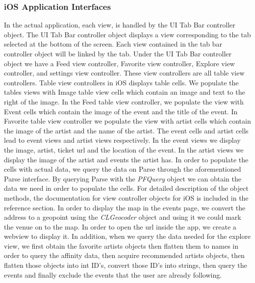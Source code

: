	  \subsubsection{iOS Application Interfaces}
	    In the actual application, each view, is handled by the UI Tab Bar controller object. The UI Tab Bar controller object displays a view 
	    corresponding to the tab selected at the bottom of the screen. Each view contained in the tab bar controller object will be linked by the 
	    tab. Under the UI Tab Bar controller object we have a Feed view controller, Favorite view controller, Explore view controller, and settings 
	    view controller. These view controllers are all table view controllers. Table view controllers in iOS displays table cells. We populate the 
	    tables views with Image table view cells which contain an image and text to the right of the image. In the Feed table view controller, we 
	    populate the view with Event cells which contain the image of the event and the title of the event. In Favorite table view controller we 
	    populate the view with artist cells which contain the image of the artist and the name of the artist. The event cells and artist cells lead to 
	    event views and artist views respectively. In the event views we display the image, artist, ticket url and the location of the event. In the 
	    artist views we display the image of the artist and events the artist has. In order to populate the cells with actual data, we query the data 
	    on Parse through the aforementioned Parse interface. By querying Parse with the \textit{PFQuery} object we can obtain the data we need in order 
	    to populate the cells. For detailed description of the object methods, the documentation for view controller objects for iOS is included in 
	    the reference section. In order to display the map in the events page, we convert the address to a geopoint using the \textit{CLGeocoder} object 
	    and using it we could mark the venue on to the map. In order to open the url inside the app, we create a webview to display it. In 
	    addition, when we query the data needed for the explore view, we first obtain the favorite artists objects then flatten them to names in 
	    order to query the affinity data, then acquire recommended artists objects, then flatten those objects into int ID’s, convert those ID’s into 
	    strings, then query the events and finally exclude the events that the user are already following. 
	  	
